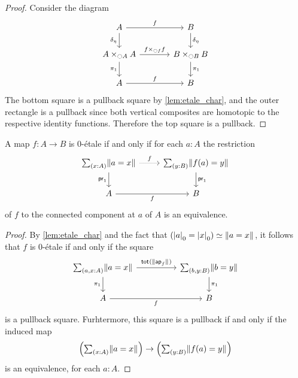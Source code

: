 \documentclass[9pt,twosided]{amsart}
\begin{document}
\begin{proof}
Consider the diagram
\begin{equation*}
\begin{tikzcd}[column sep=large]
A \arrow[d,swap,"\delta_{\modalunit}"] \arrow[r,"f"] & B \arrow[d,"\delta_{\modalunit}"] \\
A\times_{\modal A} A \arrow[d,swap,"\pi_1"] \arrow[r,"{f\times_{\modal f} f}"] & B\times_{\modal B} B \arrow[d,"\pi_1"] \\
A \arrow[r,"f"] & B
\end{tikzcd}
\end{equation*}
The bottom square is a pullback square by \cref{lem:etale_char}, and the outer rectangle is a pullback since both vertical composites are homotopic to the respective identity functions. Therefore the top square is a pullback.
\end{proof}

\begin{thm}
A map $f:A\to B$ is $0$-\'etale if and only if for each $a:A$ the restriction
\begin{equation*}
\begin{tikzcd}
\sm{x:A}\brck{a=x} \arrow[d,swap,"\proj 1"] \arrow[r,densely dotted,"f"] & \sm{y:B}\brck{f(a)=y} \arrow[d,"\proj 1"] \\
A \arrow[r,swap,"f"] & B
\end{tikzcd}
\end{equation*}
of $f$ to the connected component at $a$ of $A$ is an equivalence. 
\end{thm}

\begin{proof}
By \cref{lem:etale_char} and the fact that $\eqv{(\tproj{0}{a}=\tproj{0}{x})}{\brck{a=x}}$, it follows that $f$ is $0$-\'etale if and only if the square
\begin{equation*}
\begin{tikzcd}[column sep=huge]
\sm{a,x:A}\brck{a=x} \arrow[d,swap,"\pi_1"] \arrow[r,"\total{\brck{\apfunc{f}}}"] & \sm{b,y:B}\brck{b=y} \arrow[d,"\pi_1"] \\
A \arrow[r,swap,"f"] & B
\end{tikzcd}
\end{equation*}
is a pullback square. Furhtermore, this square is a pullback if and only if the induced map
\begin{equation*}
\Big(\sm{x:A}\brck{a=x}\Big)\to\Big(\sm{y:B}\brck{f(a)=y}\Big)
\end{equation*}
is an equivalence, for each $a:A$.
\end{proof}
\end{document}

